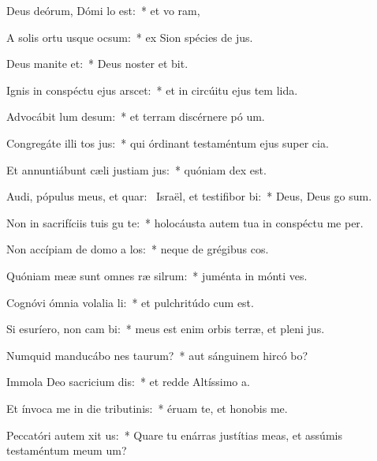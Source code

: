 \item Deus deórum, Dómi lo est:~* et vo ram,
\item A solis ortu usque  ocsum:~* ex Sion spécies de jus.
\item Deus manite et:~* Deus noster et  bit.
\item Ignis in conspéctu ejus arscet:~* et in circúitu ejus tem lida.
\item Advocábit lum desum:~* et terram discérnere pó um.
\item Congregáte illi tos jus:~* qui órdinant testaméntum ejus super cia.
\item Et annuntiábunt cæli justiam jus:~* quóniam  dex est.
\item Audi, pópulus meus, et quar:~\pscross{} Israël, et testifibor bi:~* Deus, Deus  go sum.
\item Non in sacrifíciis tuis gu te:~* holocáusta autem tua in conspéctu me  per.
\item Non accípiam de domo a los:~* neque de grégibus  cos.
\item Quóniam meæ sunt omnes ræ silrum:~* juménta in mónti  ves.
\item Cognóvi ómnia volalia li:~* et pulchritúdo  cum est.
\item Si esuríero, non cam bi:~* meus est enim orbis terræ, et pleni jus.
\item Numquid manducábo nes taurum?~* aut sánguinem hircó bo?
\item Immola Deo sacricium dis:~* et redde Altíssimo  a.
\item Et ínvoca me in die tributinis:~* éruam te, et honobis me.
\item Peccatóri autem xit us:~* Quare tu enárras justítias meas, et assúmis testaméntum meum   um?

